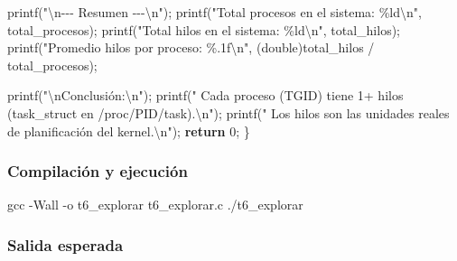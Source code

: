 \documentclass[
  spanish,
]{article}
\newenvironment{Shaded}{}{}
\newcommand{\AttributeTok}[1]{\textcolor[rgb]{0.49,0.56,0.16}{#1}}
\newcommand{\ControlFlowTok}[1]{\textcolor[rgb]{0.00,0.44,0.13}{\textbf{#1}}}
\newcommand{\DataTypeTok}[1]{\textcolor[rgb]{0.56,0.13,0.00}{#1}}
\newcommand{\DecValTok}[1]{\textcolor[rgb]{0.25,0.63,0.44}{#1}}
\newcommand{\ExtensionTok}[1]{#1}
\newcommand{\FunctionTok}[1]{\textcolor[rgb]{0.02,0.16,0.49}{#1}}
\newcommand{\NormalTok}[1]{#1}
\newcommand{\OperatorTok}[1]{\textcolor[rgb]{0.40,0.40,0.40}{#1}}
\newcommand{\SpecialCharTok}[1]{\textcolor[rgb]{0.25,0.44,0.63}{#1}}
\newcommand{\StringTok}[1]{\textcolor[rgb]{0.25,0.44,0.63}{#1}}
\begin{document}
\begin{Shaded}
\begin{Highlighting}[]
\NormalTok{    printf}\OperatorTok{(}\StringTok{"}\SpecialCharTok{\textbackslash{}n}\StringTok{{-}{-}{-} Resumen {-}{-}{-}}\SpecialCharTok{\textbackslash{}n}\StringTok{"}\OperatorTok{);}
\NormalTok{    printf}\OperatorTok{(}\StringTok{"Total procesos en el sistema: }\SpecialCharTok{\%ld\textbackslash{}n}\StringTok{"}\OperatorTok{,}\NormalTok{ total\_procesos}\OperatorTok{);}
\NormalTok{    printf}\OperatorTok{(}\StringTok{"Total hilos en el sistema:    }\SpecialCharTok{\%ld\textbackslash{}n}\StringTok{"}\OperatorTok{,}\NormalTok{ total\_hilos}\OperatorTok{);}
\NormalTok{    printf}\OperatorTok{(}\StringTok{"Promedio hilos por proceso:   }\SpecialCharTok{\%.1f\textbackslash{}n}\StringTok{"}\OperatorTok{,}
           \OperatorTok{(}\DataTypeTok{double}\OperatorTok{)}\NormalTok{total\_hilos }\OperatorTok{/}\NormalTok{ total\_procesos}\OperatorTok{);}

\NormalTok{    printf}\OperatorTok{(}\StringTok{"}\SpecialCharTok{\textbackslash{}n}\StringTok{Conclusión:}\SpecialCharTok{\textbackslash{}n}\StringTok{"}\OperatorTok{);}
\NormalTok{    printf}\OperatorTok{(}\StringTok{"  Cada proceso (TGID) tiene 1+ hilos (task\_struct en /proc/PID/task).}\SpecialCharTok{\textbackslash{}n}\StringTok{"}\OperatorTok{);}
\NormalTok{    printf}\OperatorTok{(}\StringTok{"  Los hilos son las unidades reales de planificación del kernel.}\SpecialCharTok{\textbackslash{}n}\StringTok{"}\OperatorTok{);}
    \ControlFlowTok{return} \DecValTok{0}\OperatorTok{;}
\OperatorTok{\}}
\end{Highlighting}
\end{Shaded}

\subsubsection{Compilación y
ejecución}\label{compilaciuxf3n-y-ejecuciuxf3n-5}

\begin{Shaded}
\begin{Highlighting}[]
\FunctionTok{gcc} \AttributeTok{{-}Wall} \AttributeTok{{-}o}\NormalTok{ t6\_explorar t6\_explorar.c}
\ExtensionTok{./t6\_explorar}
\end{Highlighting}
\end{Shaded}

\subsubsection{Salida esperada}\label{salida-esperada-5}
\end{document}
